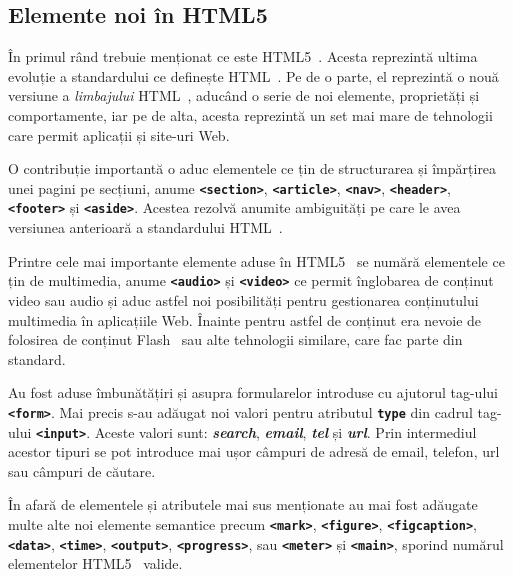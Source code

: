\documentclass[12pt]{article} %
\begin{document}

\subsection{Elemente noi în HTML5} %

În primul rând trebuie menționat ce este HTML5~\cite{website:html5}. Acesta reprezintă ultima evoluție a
standardului ce definește HTML~\cite{website:html}. Pe de o parte, el reprezintă o nouă versiune a
\textit{limbajului} HTML~\cite{website:html}, aducând o serie de noi elemente, proprietăți și comportamente,
iar pe de alta, acesta reprezintă un set mai mare de tehnologii care permit aplicații și site-uri Web.

O contribuție importantă o aduc elementele ce țin de structurarea și împărțirea unei pagini pe secțiuni,
anume \textbf{\lstinline{<section>}}, \textbf{\lstinline{<article>}}, \textbf{\lstinline{<nav>}},
\textbf{\lstinline{<header>}}, \textbf{\lstinline{<footer>}} și \textbf{\lstinline{<aside>}}.
Acestea rezolvă anumite ambiguități pe care le avea versiunea anterioară a standardului
HTML~\cite{website:html}.

Printre cele mai importante elemente aduse în HTML5~\cite{website:html5} se numără elementele ce țin de
multimedia, anume \textbf{\lstinline{<audio>}} și \textbf{\lstinline{<video>}} ce permit înglobarea de
conținut video sau audio și aduc astfel noi posibilități pentru gestionarea conținutului multimedia în
aplicațiile Web. Înainte pentru astfel de conținut era nevoie de folosirea de conținut
Flash~\cite{website:flash} sau alte tehnologii similare, care fac parte din standard.

Au fost aduse îmbunătățiri și asupra formularelor introduse cu ajutorul tag-ului \textbf{\lstinline{<form>}}.
Mai precis s-au adăugat noi valori pentru atributul \textbf{\lstinline{type}} din cadrul tag-ului
\textbf{\lstinline{<input>}}. Aceste valori sunt: \textbf{\textit{search}}, \textbf{\textit{email}},
\textbf{\textit{tel}} și \textbf{\textit{url}}. Prin intermediul acestor tipuri se pot introduce mai ușor
câmpuri de adresă de email, telefon, url sau câmpuri de căutare.

În afară de elementele și atributele mai sus menționate au mai fost adăugate multe alte noi elemente semantice
precum \textbf{\lstinline{<mark>}}, \textbf{\lstinline{<figure>}}, \textbf{\lstinline{<figcaption>}},
\textbf{\lstinline{<data>}}, \textbf{\lstinline{<time>}}, \textbf{\lstinline{<output>}},
\textbf{\lstinline{<progress>}}, sau \textbf{\lstinline{<meter>}} și \textbf{\lstinline{<main>}}, sporind
numărul elementelor HTML5~\cite{website:html5} valide.
\end{document}

